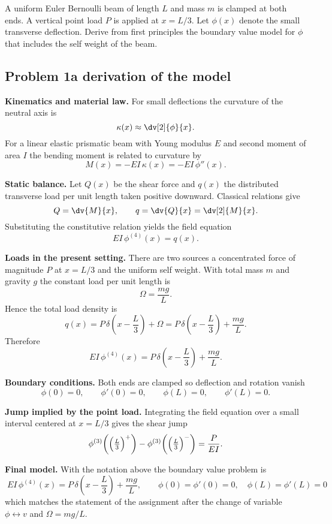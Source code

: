 \item A uniform Euler Bernoulli beam of length $L$ and mass $m$ is clamped at both ends.
A vertical point load $P$ is applied at $x=L/3$.
Let $\phi(x)$ denote the small transverse deflection.
Derive from first principles the boundary value model for $\phi$ that includes the self weight of the beam.

\subsection*{Problem 1a  derivation of the model}

\textbf{Kinematics and material law.}
For small deflections the curvature of the neutral axis is
\[
\kappa(x)\approx \dv[2]{\phi}{x}.
\]
For a linear elastic prismatic beam with Young modulus $E$ and second moment of area $I$ the bending moment is related to curvature by
\[
M(x)=-EI\,\kappa(x)=-EI\,\phi''(x).
\]

\textbf{Static balance.}
Let $Q(x)$ be the shear force and $q(x)$ the distributed transverse load per unit length taken positive downward.
Classical relations give
\[
Q=\dv{M}{x},\qquad q=\dv{Q}{x}=\dv[2]{M}{x}.
\]
Substituting the constitutive relation yields the field equation
\[
EI\,\phi^{(4)}(x)=q(x).
\]

\textbf{Loads in the present setting.}
There are two sources
a concentrated force of magnitude $P$ at $x=L/3$ and the uniform self weight.
With total mass $m$ and gravity $g$ the constant load per unit length is
\[
\Omega=\frac{mg}{L}.
\]
Hence the total load density is
\[
q(x)=P\,\delta\!\left(x-\frac{L}{3}\right)+\Omega
= P\,\delta\!\left(x-\frac{L}{3}\right)+\frac{mg}{L}.
\]
Therefore
\[
EI\,\phi^{(4)}(x)=P\,\delta\!\left(x-\frac{L}{3}\right)+\frac{mg}{L}.
\]

\textbf{Boundary conditions.}
Both ends are clamped so deflection and rotation vanish
\[
\phi(0)=0,\qquad \phi'(0)=0,\qquad \phi(L)=0,\qquad \phi'(L)=0.
\]

\textbf{Jump implied by the point load.}
Integrating the field equation over a small interval centered at $x=L/3$ gives the shear jump
\[
\phi^{(3)}\!\left(\Bigl(\tfrac{L}{3}\Bigr)^{+}\right)
-
\phi^{(3)}\!\left(\Bigl(\tfrac{L}{3}\Bigr)^{-}\right)
=\frac{P}{EI}.
\]

\textbf{Final model.}
With the notation above the boundary value problem is
\[
\boxed{\;
EI\,\phi^{(4)}(x)=P\,\delta\!\left(x-\frac{L}{3}\right)+\frac{mg}{L},
\qquad
\phi(0)=\phi'(0)=0,\quad \phi(L)=\phi'(L)=0
\;}
\]
which matches the statement of the assignment after the change of variable $\phi\leftrightarrow v$ and $\Omega=mg/L$.

